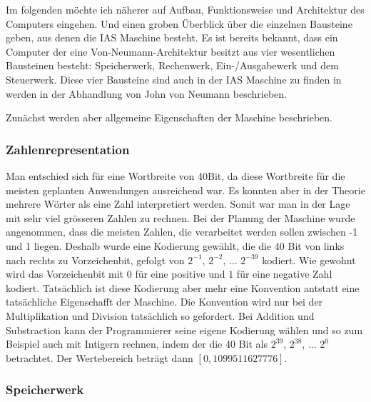 \documentclass[12pt]{report}
\begin{document}
Im folgenden möchte ich näherer auf Aufbau, Funktionsweise und Architektur des Computers eingehen. Und einen groben Überblick über
die einzelnen Bausteine geben, aus denen die IAS Maschine besteht. Es ist bereits bekannt, dass ein Computer der eine Von-Neumann-Architektur 
besitzt aus vier wesentlichen Bausteinen besteht: Speicherwerk, Rechenwerk, Ein-/Ausgabewerk und dem Steuerwerk. Diese vier Bausteine sind
auch in der IAS Maschine zu finden in werden in der Abhandlung von John von Neumann beschrieben.

Zunächst werden aber allgemeine Eigenschaften der Maschine beschrieben.

\subsubsection{Zahlenrepresentation}

Man entschied sich für eine Wortbreite von 40Bit, da diese Wortbreite für die meisten geplanten Anwendungen ausreichend war. Es konnten aber in der Theorie mehrere
Wörter als eine Zahl interpretiert werden. Somit war man in der Lage mit sehr viel grösseren Zahlen zu rechnen.
Bei der Planung der Maschine wurde angenommen, dass die meisten Zahlen, die verarbeitet werden sollen zwischen -1 und 1 liegen.
Deshalb wurde eine Kodierung gewählt, die die 40 Bit von links nach rechts zu Vorzeichenbit, gefolgt von $2^{-1}$, $2^{-2}$, ... $2^{-39}$ kodiert.
Wie gewohnt wird das Vorzeichenbit mit $0$ für eine positive und $1$ für eine negative Zahl kodiert.
Tatsächlich ist diese Kodierung aber mehr eine Konvention antstatt eine tatsächliche Eigenschafft der Maschine. Die Konvention wird nur bei der 
Multiplikation und Division tatsächlich so gefordert. Bei Addition und Substraction kann der Programmierer seine eigene Kodierung wählen und so
zum Beispiel auch mit Intigern rechnen, indem der die 40 Bit als $2^{39}$, $2^{38}$, ... $2^{0}$ betrachtet. Der Wertebereich beträgt dann $[0,1099511627776]$.

\subsubsection{Speicherwerk}
\end{document}
